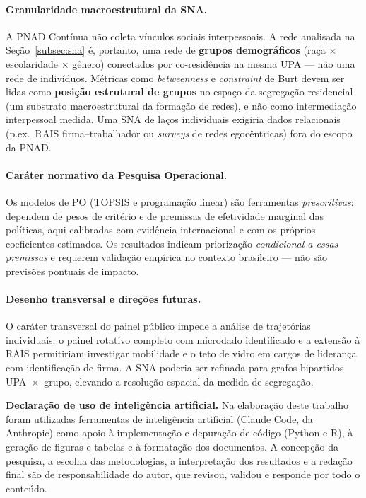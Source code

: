 \documentclass[12pt, a4paper, oneside]{article}
\begin{document}
\paragraph{Granularidade macroestrutural da SNA.}
A PNAD Contínua não coleta vínculos sociais interpessoais. A rede analisada na
Seção~\ref{subsec:sna} é, portanto, uma rede de \textbf{grupos demográficos}
(raça $\times$ escolaridade $\times$ gênero) conectados por co-residência na
mesma UPA --- não uma rede de indivíduos. Métricas como \textit{betweenness} e
\textit{constraint} de Burt devem ser lidas como \textbf{posição estrutural de
grupos} no espaço da segregação residencial (um substrato macroestrutural da
formação de redes), e não como intermediação interpessoal medida. Uma SNA de
laços individuais exigiria dados relacionais (p.ex.\ RAIS firma--trabalhador ou
\textit{surveys} de redes egocêntricas) fora do escopo da PNAD.

\paragraph{Caráter normativo da Pesquisa Operacional.}
Os modelos de PO (TOPSIS e programação linear) são ferramentas
\textit{prescritivas}: dependem de pesos de critério e de premissas de
efetividade marginal das políticas, aqui calibradas com evidência internacional
e com os próprios coeficientes estimados. Os resultados indicam priorização
\textit{condicional a essas premissas} e requerem validação empírica no
contexto brasileiro --- não são previsões pontuais de impacto.

\paragraph{Desenho transversal e direções futuras.}
O caráter transversal do painel público impede a análise de trajetórias
individuais; o painel rotativo completo com microdado identificado e a extensão
à RAIS permitiriam investigar mobilidade e o teto de vidro em cargos de liderança
com identificação de firma. A SNA poderia ser refinada para grafos bipartidos
UPA~$\times$~grupo, elevando a resolução espacial da medida de segregação.

\bigskip

\noindent\textbf{Declaração de uso de inteligência artificial.}
Na elaboração deste trabalho foram utilizadas ferramentas de inteligência
artificial (Claude Code, da Anthropic) como apoio à implementação e depuração de
código (Python e R), à geração de figuras e tabelas e à formatação dos documentos.
A concepção da pesquisa, a escolha das metodologias, a interpretação dos resultados
e a redação final são de responsabilidade do autor, que revisou, validou e responde
por todo o conteúdo.

\newpage

\end{document}
